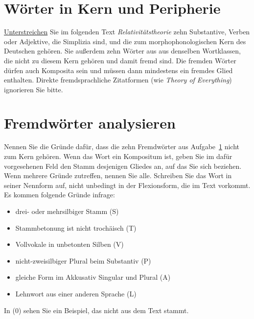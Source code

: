 \section{Wörter in Kern und Peripherie}\label{sec:woerter}

\ul{Unterstreichen} Sie im folgenden Text \textit{Relativitätstheorie} zehn Substantive, Verben oder Adjektive, die Simplizia sind, und die zum morphophonologischen Kern des Deutschen gehören.
 Sie außerdem zehn Wörter aus aus denselben Wortklassen, die nicht zu diesem Kern gehören und damit fremd sind.
Die fremden Wörter dürfen auch Komposita sein und müssen dann mindestens ein fremdes Glied enthalten.
Direkte fremdsprachliche Zitatformen (wie \textit{Theory of Everything}) ignorieren Sie bitte.

\section{Fremdwörter analysieren}\label{sec:analyse}

Nennen Sie die Gründe dafür, dass die zehn Fremdwörter aus Aufgabe~\ref{sec:woerter} nicht zum Kern gehören.
Wenn das Wort ein Kompositum ist, geben Sie im dafür vorgesehenen Feld den Stamm desjenigen Gliedes an, auf das Sie sich beziehen.
Wenn mehrere Gründe zutreffen, nennen Sie alle.
Schreiben Sie das Wort in seiner Nennform auf, nicht unbedingt in der Flexionsform, die im Text vorkommt.
Es kommen folgende Gründe infrage:

\begin{itemize}\Lf
  \item drei- oder mehrsilbiger Stamm (S)
  \item Stammbetonung ist nicht trochäisch (T)
  \item Vollvokale in unbetonten Silben (V)
  \item nicht-zweisilbiger Plural beim Substantiv (P)
  \item gleiche Form im Akkusativ Singular und Plural (A)
  \item Lehnwort aus einer anderen Sprache (L)
\end{itemize}

In (0) sehen Sie ein Beispiel, das nicht aus dem Text stammt.

